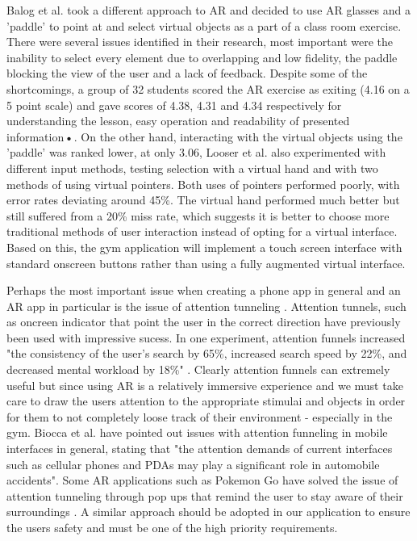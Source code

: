 \documentclass{l4proj}
\begin{document}
Balog et al. took a different approach to AR and decided to use AR glasses and a 'paddle' to point at and select virtual objects as a part of a class room exercise. There were several issues identified in their research, most important were the inability to select every element due to overlapping and low fidelity, the paddle blocking the view of the user and a lack of feedback\cite{balog_augmented_2007}. Despite some of the shortcomings, a group of 32 students scored the AR exercise as exiting (4.16 on a 5 point scale) and gave scores of 4.38, 4.31 and 4.34 respectively for understanding the lesson, easy operation and readability of presented information\textbf{•}. On the other hand, interacting with the virtual objects using the 'paddle' was ranked lower, at only 3.06\cite{balog_augmented_2007}, Looser et al. also experimented with different input methods, testing selection with a virtual hand and with two methods of using virtual pointers\cite{looser_evaluation_2007}. Both uses of pointers performed poorly, with error rates deviating around 45\%\cite{looser_evaluation_2007}. The virtual hand performed much better but still suffered from a 20\% miss rate\cite{looser_evaluation_2007}, which suggests it is better to choose  more traditional methods of user interaction instead of opting for a virtual interface. Based on this, the gym application will implement a touch screen interface with standard onscreen buttons rather than using a fully augmented virtual interface. 

Perhaps the most important issue when creating a phone app in general and an AR app in particular is the issue of attention tunneling \cite{radu_why_2012} \cite{biocca_attention_2007}. Attention tunnels, such as oncreen indicator that point the user in the correct direction have previously been used with impressive sucess\cite{biocca_attention_2007}. In one experiment, attention funnels increased "the consistency of the user’s search by 65\%,  increased search speed by 22\%, and decreased mental workload by 18\%" \cite{biocca_attention_2007}. Clearly attention funnels can extremely useful but since using AR is a relatively immersive experience and we must take care to draw the users attention to the appropriate stimulai and objects in order for them to not completely loose track of their environment - especially in the gym. Biocca et al. have pointed out issues with attention funneling in mobile interfaces in general, stating that "the attention demands of current interfaces such as cellular phones and PDAs may play a significant role in automobile accidents". Some AR applications such as Pokemon Go have solved the issue of attention tunneling through pop ups that remind the user to stay aware of their surroundings \cite{hollister_drivers_2016}. A similar approach should be adopted in our application to ensure the users safety and must be one of the high priority requirements.
\end{document}
